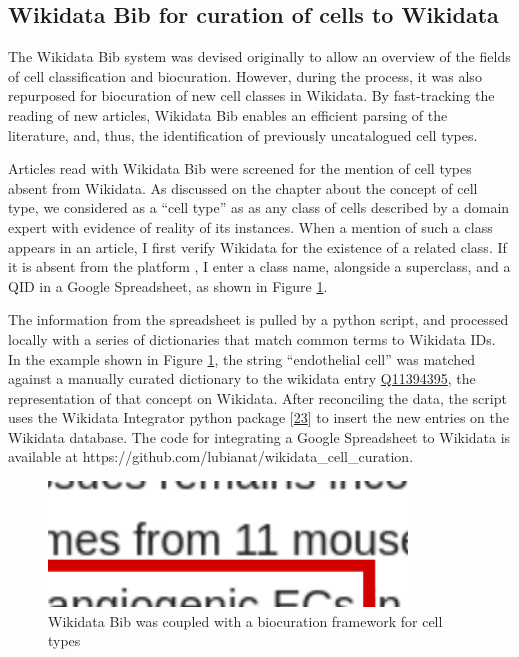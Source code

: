 \hypertarget{wikidata-bib-for-curation-of-cells-to-wikidata}{%
\subsection{Wikidata Bib for curation of cells to Wikidata}\label{wikidata-bib-for-curation-of-cells-to-wikidata}}

The Wikidata Bib system was devised originally to allow an overview of the fields of cell classification and biocuration.
However, during the process, it was also repurposed for biocuration of new cell classes in Wikidata.
By fast-tracking the reading of new articles, Wikidata Bib enables an efficient parsing of the literature, and, thus, the identification of previously uncatalogued cell types.

Articles read with Wikidata Bib were screened for the mention of cell types absent from Wikidata.
As discussed on the chapter about the concept of cell type, we considered as a ``cell type'' as as any class of cells described by a domain expert with evidence of reality of its instances.
When a mention of such a class appears in an article, I first verify Wikidata for the existence of a related class.
If it is absent from the platform , I enter a class name, alongside a superclass, and a QID in a Google Spreadsheet, as shown in Figure \ref{fig:biocuration_of_cells}.

The information from the spreadsheet is pulled by a python script, and processed locally with a series of dictionaries that match common terms to Wikidata IDs.
In the example shown in Figure \ref{fig:biocuration_of_cells}, the string ``endothelial cell'' was matched against a manually curated dictionary to the wikidata entry \href{https://www.wikidata.org/wiki/Q11394395}{Q11394395}, the representation of that concept on Wikidata.
After reconciling the data, the script uses the Wikidata Integrator python package {[}\protect\hyperlink{ref-qDI8I4IJ}{23}{]} to insert the new entries on the Wikidata database.
The code for integrating a Google Spreadsheet to Wikidata is available at https://github.com/lubianat/wikidata\_cell\_curation.

\begin{figure}
\hypertarget{fig:biocuration_of_cells}{%
\centering
\includegraphics[width=0.85\textwidth,height=\textheight]{images/biocuration_of_cells.png}
\caption{Wikidata Bib was coupled with a biocuration framework for cell types}\label{fig:biocuration_of_cells}
}
\end{figure}

